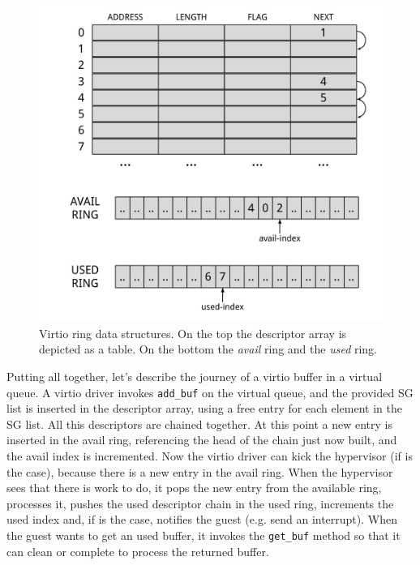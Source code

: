 \begin{figure}[bt]
\centering
\includegraphics[scale = 0.48]{vring.pdf}
\caption{Virtio ring data structures. On the top the descriptor array is depicted as a table. On the bottom the \emph{avail} ring and the 
	 \emph{used} ring.}
\label{fig:vring}
\end{figure}

\vspace{0.5cm}

Putting all together, let's describe the journey of a virtio buffer in a virtual queue. A virtio driver invokes \texttt{add\_buf} on the
virtual queue, and the provided SG list is inserted in the descriptor array, using a free entry for each element in the SG list. All this
descriptors are chained together. At this point a new entry is inserted in the avail ring, referencing the head of the chain just now
built, and the avail index is incremented.
Now the virtio driver can kick the hypervisor (if is the case), because there is a new entry in the avail ring.
When the hypervisor sees that there is work to do, it pops the new entry from the available ring, processes it, pushes the used descriptor
chain in the used ring, increments the used index and, if is the case, notifies the guest (e.g. send an interrupt). When the guest wants 
to get an used buffer, it invokes the \texttt{get\_buf} method so that it can clean or complete to process the returned buffer.


